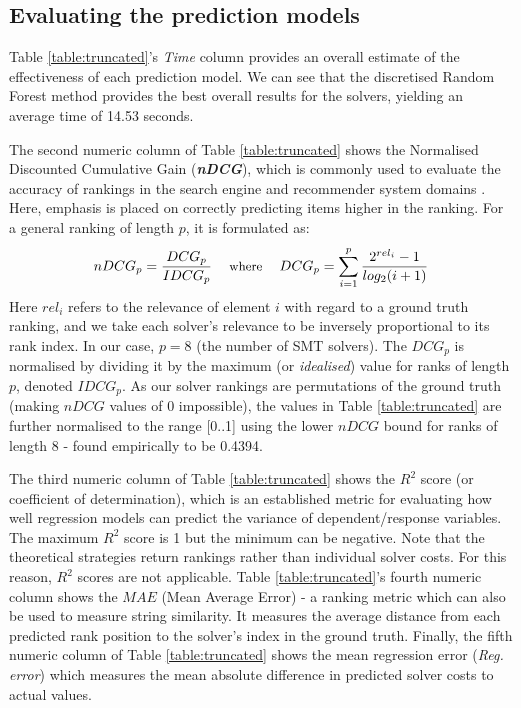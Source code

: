 \documentclass[runningheads,a4paper]{llncs}
\begin{document}
\subsection{Evaluating the prediction models}

Table \ref{table:truncated}'s \textit{Time} column provides an overall estimate of the effectiveness of each prediction model.  We can see that the discretised Random Forest method provides the best overall results for the solvers, yielding an average time of 14.53 seconds.

The second numeric column of Table \ref{table:truncated} shows the 
Normalised Discounted Cumulative Gain (\textit{\textbf{nDCG}}), which is commonly used to evaluate the accuracy of rankings in the search engine and recommender system domains \cite{NDCG}. Here, emphasis is placed on correctly predicting items higher in the ranking. For a general ranking of length $p$, it is formulated as:
\[\small
	nDCG_p = \frac{DCG_p}{IDCG_p}
    \quad\text{ where }\quad
    DCG_p = \sum_{i=1}^{p} \frac{2^{rel_i} - 1}{log_2(i+1)}
\]
Here $rel_i$ refers to the relevance of element $i$ with regard to a ground truth ranking, and we take each solver's relevance to be inversely proportional to its rank index.  In our case, $p = 8$ (the number of SMT solvers).  The $DCG_p$ is normalised by dividing it by the maximum (or \textit{idealised}) value for ranks of length $p$, denoted $IDCG_p$. As our solver rankings are permutations of the ground truth (making $nDCG$ values of 0 impossible), the values in Table \ref{table:truncated} are further normalised to the range [0..1] using the lower $nDCG$ bound for ranks of length 8 - found empirically to be 0.4394. 

The third numeric column of Table \ref{table:truncated} shows
the $R^2$ score (or coefficient of determination), which is an established metric for evaluating how well regression models can predict the variance of dependent/response variables. The maximum $R^2$ score is 1 but the minimum can be negative. Note that the theoretical strategies return rankings rather than individual solver costs. For this reason, $R^2$ scores are not applicable. Table \ref{table:truncated}'s fourth numeric column shows the $MAE$ (Mean Average Error) - a ranking metric which can also be used to measure string similarity. It measures the average distance from each predicted rank position to the solver's index in the ground truth. Finally, 
the fifth numeric column of Table \ref{table:truncated} shows
the mean regression error (\textit{Reg. error}) which measures the mean absolute difference in predicted solver costs to actual values. 
\end{document}

